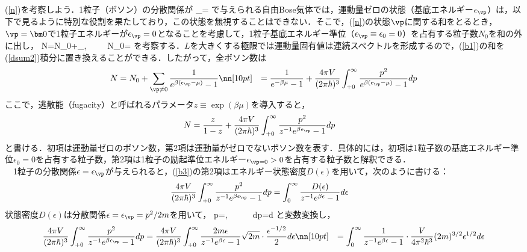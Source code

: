 \subsection{}
(\ref{n})を考察しよう．1粒子（ボソン）の分散関係が
\be\label{b0}
\epsilon_{\vp}=
\ee
で与えられる自由Bose気体では，運動量ゼロの状態（基底エネルギー$\epsilon_{\vp}$）は，以下で見るように特別な役割を果たしており，この状態を無視することはできない．そこで，(\ref{n})の状態$\vp$に関する和をとるとき，$\vp=\bm0$で1粒子エネルギーが$\epsilon_{\vp}=0$となることを考慮して，1粒子基底エネルギー準位（$\epsilon_{\vp}\equiv\epsilon_{0}=0$）を占有する粒子数$N_0$を和の外に出し，
\be\label{b1}
N=N_0+\displaystyle\sum_{\vp{}},\ \ \ \ \ N_0=
\ee
を考察する．$L$を大きくする極限では運動量固有値は連続スペクトルを形成するので，(\ref{b1})の和を(\ref{dsum2})積分に置き換えることができる．したがって，全ボソン数は
\begin{align}\label{b2}
N&=N_0+\displaystyle\sum_{\vp\neq0}\frac{1}{e^{\beta(\epsilon_{\vp}-\mu)}-1}\nn[10pt]
&=\frac{1}{e^{-\beta\mu}-1}
+\frac{4\pi V}{(2\pi\hbar)^3}\int_{+0}^{\infty}\frac{p^2}{e^{\beta(\epsilon_{\vp}-\mu)}-1}dp
\end{align}
ここで，逃散能（fugacity）と呼ばれるパラメータ$z\equiv\exp(\beta\mu)$を導入すると，
\begin{align}\label{b3}
N&=\frac{z}{1-z}
+\frac{4\pi V}{(2\pi\hbar)^3}\int_{+0}^{\infty}\frac{p^2}{z^{-1}e^{\beta\epsilon_{\vp}}-1}dp
\end{align}
と書ける．初項は運動量ゼロのボソン数，第2項は運動量がゼロでないボソン数を表す．具体的には，初項は1粒子数の基底エネルギー準位$\epsilon_{0}=0$を占有する粒子数，第2項は1粒子の励起準位エネルギー$\epsilon_{\vp=0}>0$を占有する粒子数と解釈できる．\\
%
　1粒子の分散関係$\epsilon=\epsilon_{\vp}$が与えられると，(\ref{b3})の第2項はエネルギー状態密度$D(\epsilon)$を用いて，次のように書ける：
\begin{align}\label{b4}
\frac{4\pi V}{(2\pi\hbar)^3}\int_{+0}^{\infty}\frac{p^2}{z^{-1}e^{\beta\epsilon_{\vp}}-1}dp
&=\int_{0}^{\infty}\frac{D(\epsilon)}{z^{-1}e^{\beta\epsilon}-1}d\epsilon
\end{align}
状態密度$D(\epsilon)$は分散関係$\epsilon=\epsilon_{\vp}=p^2/2m$を用いて，
\be
p=,\ \ \ \ \ \ dp=\cdot{}d\epsilon
\ee
と変数変換し，
\begin{align}\label{b5}
\frac{4\pi V}{(2\pi\hbar)^3}\int_{+0}^{\infty}\frac{p^2}{z^{-1}e^{\beta\epsilon_{\vp}}-1}dp
&=\frac{4\pi V}{(2\pi\hbar)^3}\int_{+0}^{\infty}\frac{2m\epsilon}{z^{-1}e^{\beta\epsilon}-1}\sqrt{2m}\cdot\frac{\epsilon^{-1/2}}{2}d\epsilon\nn[10pt]
%
&=\int_{0}^{\infty}\frac{1}{z^{-1}e^{\beta\epsilon}-1}\cdot
\frac{V}{4\pi^2\hbar^3}(2m)^{3/2}\epsilon^{1/2}d\epsilon
\end{align}
